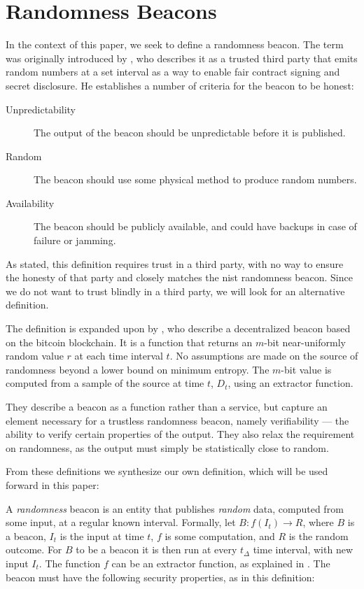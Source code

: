 \section{Randomness Beacons}

In the context of this paper, we seek to define a randomness beacon.
The term was originally introduced by \citet{rabin1983transaction}, who describes it as a trusted third party that emits random numbers at a set interval as a way to enable fair contract signing and secret disclosure.
He establishes a number of criteria for the beacon to be honest:

\begin{description}
    \item[Unpredictability] The output of the beacon should be unpredictable before it is published.
    \item[Random] The beacon should use some physical method to produce random numbers.
    \item[Availability] The beacon should be publicly available, and could have backups in case of failure or jamming.
\end{description}

As stated, this definition requires trust in a third party, with no way to ensure the honesty of that party and closely matches the \gls{nist} randomness beacon.
Since we do not want to trust blindly in a third party, we will look for an alternative definition.

The definition is expanded upon by \citet{bonneau2015bitcoin}, who describe a decentralized beacon based on the bitcoin blockchain.
It is a function that returns an $m$-bit near-uniformly random value $r$ at each time interval $t$.
No assumptions are made on the source of randomness beyond a lower bound on minimum entropy.
The $m$-bit value is computed from a sample of the source at time $t$, $D_t$, using an extractor function.

They describe a beacon as a function rather than a service, but capture an element necessary for a trustless randomness beacon, namely verifiability --- the ability to verify certain properties of the output.
They also relax the requirement on randomness, as the output must simply be statistically close to random.

From these definitions we synthesize our own definition, which will be used forward in this paper:

A \emph{randomness} beacon is an entity that publishes \emph{random} data, computed from some input, at a regular known interval.
Formally, let $B: f(I_t) \rightarrow R$, where $B$ is a beacon, $I_t$ is the input at time $t$, $f$ is some computation, and $R$ is the random outcome.
For $B$ to be a beacon it is then run at every $t_\Delta$ time interval, with new input $I_t$.
The function $f$ can be an extractor function, as explained in .
The beacon must have the following security properties, as in this definition:

